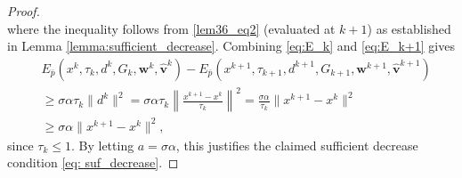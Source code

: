 \documentclass[11pt,a4paper]{article}
\def\hat{\widehat}\def\Hat{\widehat}
\theoremstyle{plain}
\begin{document}
\begin{proof}
\begin{equation}
\end{equation}
where the inequality follows from \eqref{lem36_eq2} (evaluated at $k+1$) as established in Lemma \ref{lemma:sufficient_decrease}. Combining \eqref{eq:E_k} and \eqref{eq:E_k+1} gives
\begin{equation*}
    \begin{aligned}
        &E_{\bar p}(x^k,\tau_k,d^k,G_k,{\mathbf{w}^k,\mathbf{\hat{v}}^k})-E_{\bar p}(x^{k+1},\tau_{k+1},d^{k+1},G_{k+1},{\mathbf{w}^{k+1},\mathbf{\hat{v}}^{k+1}})\\
        &\geq {\sigma\alpha\tau_k\|d^k\|^2 = \sigma\alpha\tau_k \left\| \frac{x^{k+1}-x^k}{\tau_k} \right\|^2 = \frac{\sigma\alpha}{\tau_k}\|x^{k+1}-x^k\|^2}\\
        &\geq{\sigma\alpha\|x^{k+1}-x^k\|^2},
    \end{aligned}
\end{equation*}
{since $\tau_k \le 1$. By letting $a = \sigma\alpha$, this justifies the claimed sufficient decrease condition \eqref{eq: suf_decrease}.}


\end{proof}
\end{document}
